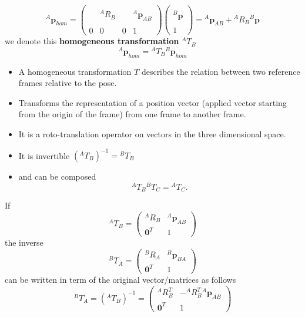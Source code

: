 \documentclass[10pt, letterpaper]{report}
\begin{document}
\begin{equation}
     {}^A\mathbf p_{hom}=\begin{pmatrix}
        & & & \\ 
        &{}^AR_B & & {}^A\mathbf p_{AB} \\ 
        & & & \\
        0&0 &0 & 1
     \end{pmatrix}\begin{pmatrix}
        \\ {}^B\mathbf p \\ \\ 1 
    \end{pmatrix}={}^A\mathbf p_{AB}+{}^AR_B{}^B\mathbf p
\end{equation}
we denote this \textbf{homogeneous transformation} ${}^AT_B$\begin{equation}
     {}^A\mathbf p_{hom}={}^AT_B{}^B\mathbf p_{hom}
\end{equation}\begin{itemize}
    \item A homogeneous transformation $T$ describes the relation between two reference frames relative to the pose.
    \item Transforms the representation of a position vector
(applied vector starting from the origin of the frame)
from one frame to another frame.
\item It is a roto-translation operator on vectors in the three dimensional space. 
\item It is invertible $({}^AT_B)^{-1}={}^BT_B$
\item and can be composed\begin{equation}
    {}^AT_B{}^BT_C={}^AT_C.
\end{equation}
\end{itemize}
If $${}^AT_B=\begin{pmatrix}
    {}^AR_B&{}^A\mathbf p_{AB}\\ 
    \mathbf 0^T&1
\end{pmatrix}$$
the inverse 
$${}^BT_A=\begin{pmatrix}
    {}^BR_A&{}^B\mathbf p_{BA}\\ 
    \mathbf 0^T&1
\end{pmatrix}$$
can be written in term of the original vector/matrices as follows\begin{equation}
    {}^BT_A=({}^AT_B)^{-1}=\begin{pmatrix}
    {}^AR_B^T&-{}^AR_B^T{}^A\mathbf p_{AB}\\ 
    \mathbf 0^T&1
\end{pmatrix}
\end{equation}
\end{document}
